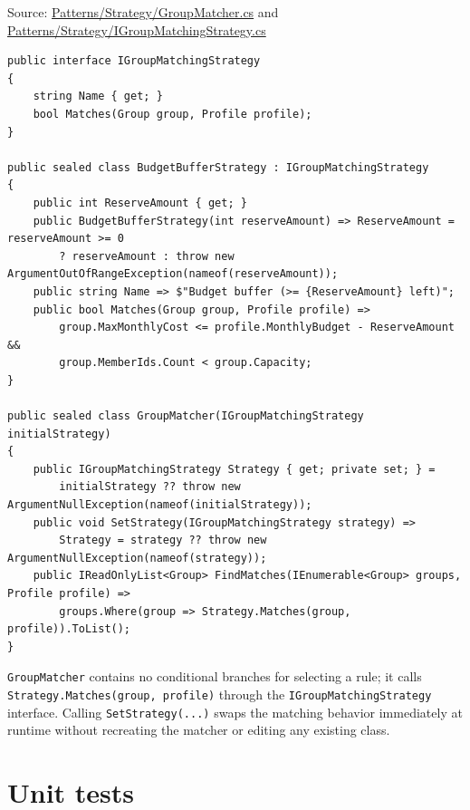 \documentclass{utmreport}
\providecommand{\passthrough}[1]{#1}
\begin{document}
Source: \href{https://github.com/Lucian-Adrian/sem5-software-design/blob/main/lab-03/csharp/src/Domi.Behavioral/Patterns/Strategy/GroupMatcher.cs}{Patterns/Strategy/GroupMatcher.cs} and \href{https://github.com/Lucian-Adrian/sem5-software-design/blob/main/lab-03/csharp/src/Domi.Behavioral/Patterns/Strategy/IGroupMatchingStrategy.cs}{Patterns/Strategy/IGroupMatchingStrategy.cs}

\begin{lstlisting}
public interface IGroupMatchingStrategy
{
    string Name { get; }
    bool Matches(Group group, Profile profile);
}

public sealed class BudgetBufferStrategy : IGroupMatchingStrategy
{
    public int ReserveAmount { get; }
    public BudgetBufferStrategy(int reserveAmount) => ReserveAmount = reserveAmount >= 0
        ? reserveAmount : throw new ArgumentOutOfRangeException(nameof(reserveAmount));
    public string Name => $"Budget buffer (>= {ReserveAmount} left)";
    public bool Matches(Group group, Profile profile) =>
        group.MaxMonthlyCost <= profile.MonthlyBudget - ReserveAmount &&
        group.MemberIds.Count < group.Capacity;
}

public sealed class GroupMatcher(IGroupMatchingStrategy initialStrategy)
{
    public IGroupMatchingStrategy Strategy { get; private set; } =
        initialStrategy ?? throw new ArgumentNullException(nameof(initialStrategy));
    public void SetStrategy(IGroupMatchingStrategy strategy) =>
        Strategy = strategy ?? throw new ArgumentNullException(nameof(strategy));
    public IReadOnlyList<Group> FindMatches(IEnumerable<Group> groups, Profile profile) =>
        groups.Where(group => Strategy.Matches(group, profile)).ToList();
}
\end{lstlisting}

\passthrough{\lstinline!GroupMatcher!} contains no conditional branches for selecting a rule; it calls \passthrough{\lstinline!Strategy.Matches(group, profile)!} through the \passthrough{\lstinline!IGroupMatchingStrategy!} interface. Calling \passthrough{\lstinline!SetStrategy(...)!} swaps the matching behavior immediately at runtime without recreating the matcher or editing any existing class.

\section{Unit tests}
\end{document}
